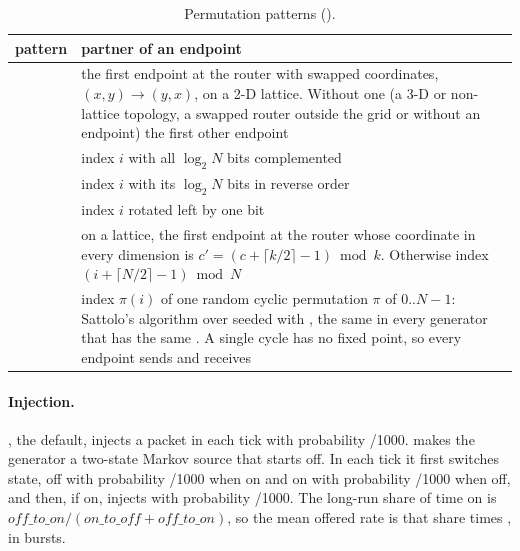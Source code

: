 \begin{table}[htbp]\centering\small
\caption{Permutation patterns ().}\label{tab:noc-patterns}
\begin{tabularx}{\textwidth}{@{}lY@{}}
\toprule pattern & partner of an endpoint \\ \midrule
{} & the first endpoint at the router with swapped coordinates, $(x,y) \to (y,x)$, on a 2-D lattice. Without one (a 3-D or non-lattice topology, a swapped router outside the grid or without an endpoint) the first other endpoint \\
 & index $i$ with all $\log_2 N$ bits complemented \\
 & index $i$ with its $\log_2 N$ bits in reverse order \\
 & index $i$ rotated left by one bit \\
 & on a lattice, the first endpoint at the router whose coordinate in every dimension is $c' = (c + \lceil k/2 \rceil - 1) \bmod k$. Otherwise index $(i + \lceil N/2 \rceil - 1) \bmod N$ \\
 & index $\pi(i)$ of one random cyclic permutation $\pi$ of $0..N-1$: Sattolo's algorithm over  seeded with , the same in every generator that has the same . A single cycle has no fixed point, so every endpoint sends and receives \\
\bottomrule
\end{tabularx}
\end{table}

\paragraph{Injection.}  , the default, injects a packet in each
tick with probability /1000.  makes the generator a two-state Markov source
that starts off. In each tick it first switches state, off with probability
/1000 when on and on with probability /1000 when off, and then,
if on, injects with probability /1000. The long-run share of time on is
$\textit{off\_to\_on} / (\textit{on\_to\_off} + \textit{off\_to\_on})$, so the mean offered rate is
that share times , in bursts.

